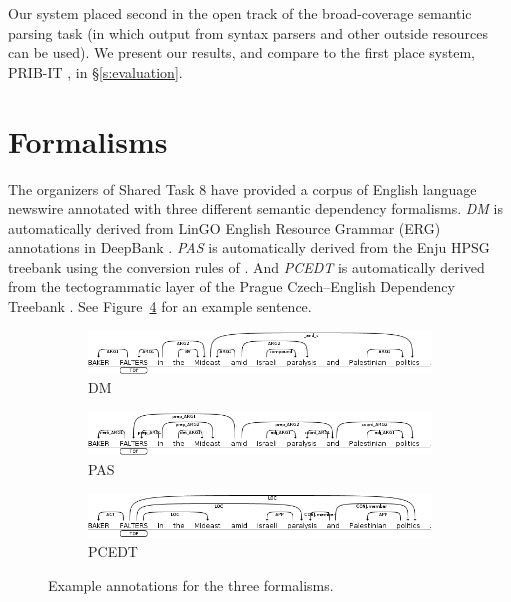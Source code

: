 \documentclass[11pt]{article}
\newcommand{\sam}[1]{\textcolor{blue}{[#1 -SMT]}}
\begin{document}
Our system placed second in the open track of the broad-coverage semantic
parsing task (in which output from syntax parsers and other outside resources can be used).
We present our results, and compare to the first place system, PRIB-IT
\cite{martins_prib_2014}, in \S\ref{s:evaluation}.



\section{Formalisms} \label{s:formalisms}

The organizers of Shared Task 8 have provided a corpus of English language
newswire annotated with three different semantic dependency formalisms.
\emph{DM} is automatically derived from LinGO English Resource Grammar (ERG)
annotations in DeepBank \cite{flickinger_deepbank_2012}.
\emph{PAS} is automatically derived from the Enju HPSG treebank using the
conversion rules of .
And \emph{PCEDT} is automatically derived from the tectogrammatic layer of the
Prague Czech--English Dependency Treebank \cite{hajic_building_1998}.
See Figure~\ref{fig:formalisms} for an example sentence.
\begin{figure}
	\centering
	\begin{subfigure}{0.7\textwidth}
		\includegraphics[width=\textwidth]{fig/example_dm}
		\caption{DM}
		\label{fig:dm}
	\end{subfigure}
	\begin{subfigure}{0.7\textwidth}
		\includegraphics[width=\textwidth]{fig/example_pas}
		\caption{PAS}
		\label{fig:pas}
	\end{subfigure}
	\begin{subfigure}{0.7\textwidth}
		\includegraphics[width=\textwidth]{fig/example_pcedt}
		\caption{PCEDT}
		\label{fig:pcedt}
	\end{subfigure}
	\caption{Example annotations for the three formalisms.}
	\label{fig:formalisms}
\end{figure}
\end{document}
